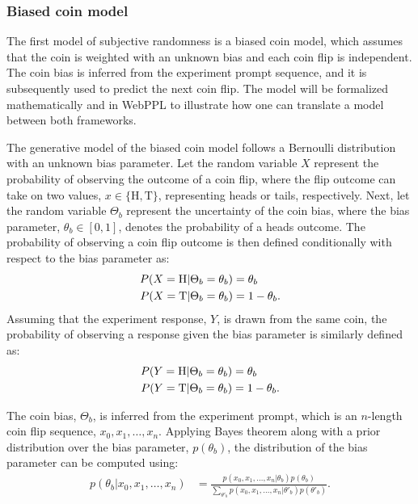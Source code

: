\documentclass{article}
\begin{document}
\subsubsection{Biased coin model}
\label{s:tutorial:sss:biased}

The first model of subjective randomness is a biased coin model, which assumes that the coin is weighted with an unknown bias and each coin flip is independent. The coin bias is inferred from the experiment prompt sequence, and it is subsequently used to predict the next coin flip. The model will be formalized mathematically and in WebPPL to illustrate how one can translate a model between both frameworks.

The generative model of the biased coin model follows a Bernoulli distribution with an unknown bias parameter. Let the random variable $X$ represent the probability of observing the outcome of a coin flip, where the flip outcome can take on two values, $x \in \{\textrm{H},\textrm{T}\}$, representing heads or tails, respectively. Next, let the random variable $\Theta_b$ represent the uncertainty of the coin bias, where the bias parameter, $\theta_b \in [0,1]$, denotes the probability of a heads outcome. The probability of observing a coin flip outcome is then defined conditionally with respect to the bias parameter as:
\begin{align}
    P(X = \textrm{H} | \Theta_b = \theta_b) &= \theta_b \notag \\ 
    P(X = \textrm{T} | \Theta_b = \theta_b) &= 1 - \theta_b \label{eq:bcoin_x}.
\end{align}
Assuming that the experiment response, $Y$, is drawn from the same coin, the probability of observing a response given the bias parameter is similarly defined as: 
\begin{align}
    P(Y = \textrm{H} | \Theta_b = \theta_b) &= \theta_b \notag \\ 
    P(Y = \textrm{T} | \Theta_b = \theta_b) &= 1 - \theta_b \label{eq:bcoin_y}.
\end{align}

The coin bias, $\Theta_b$, is inferred from the experiment prompt, which is an $n$-length coin flip sequence, $x_0, x_1, \dots, x_n$. Applying Bayes theorem along with a prior distribution over the bias parameter, $p(\theta_b)$, the distribution of the bias parameter can be computed using:
\begin{align}
    p(\theta_b | x_0, x_1, \dots, x_n) &= \frac{p(x_0,x_1, \dots, x_n | \theta_b)p(\theta_b)} {\sum\limits_{\theta'_b} p(x_0, x_1, \dots, x_n | \theta'_b)p(\theta'_b)} \label{eq:bcoin_bayes}.
\end{align}
\end{document}
